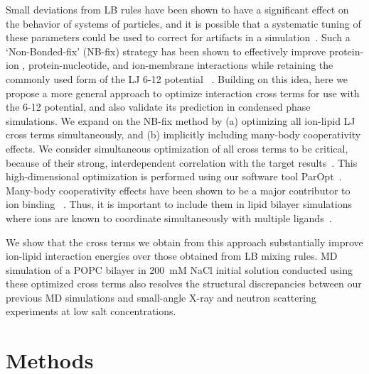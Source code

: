 \documentclass[12pt,openany,final]{book}
\begin{document}
Small deviations from LB rules have been shown to have a significant
    effect on the behavior of systems of particles\cite{boda:2008:effects}, and
    it is possible that a systematic tuning of these parameters could be used to correct 
    for artifacts in a simulation~\cite{baker:2010:accurate,yoo:2012:improved,fyta:2012:ionic,mamatkulov:2013:force,venable:2013,
savelyev:2014:balancing,li:2015:representation,savelyev:2015:competition,jing:2017:study,reif:2017,wineman:2019}.
Such a `Non-Bonded-fix' (NB-fix) strategy has been shown to effectively improve 
protein-ion 
, protein-nucleotide, and ion-membrane interactions 
while retaining the commonly used form of the LJ 6-12 potential~
\cite{baker:2010:accurate,yoo:2012:improved,fyta:2012:ionic,mamatkulov:2013:force,venable:2013,
savelyev:2014:balancing,li:2015:representation,savelyev:2015:competition,jing:2017:study,reif:2017,wineman:2019}. 
Building on this idea, here we propose a more 
general approach to optimize interaction cross terms
for use with the 6-12 potential, 
and also validate its prediction in condensed phase simulations.  
We expand on the NB-fix method by
(a) optimizing all ion-lipid LJ cross terms simultaneously, and 
(b) implicitly including many-body cooperativity effects.
We consider simultaneous optimization of all cross terms to be critical, 
because of their strong, interdependent correlation with the target results~\cite{fogarty:2014:paropt}.
This high-dimensional optimization is performed using our software tool
ParOpt~\cite{fogarty:2014:paropt,fogarty:2014:thesis}.
Many-body cooperativity effects have been shown to be a major contributor to ion 
binding~\cite{varma:2010}
. Thus, it is important to include them in lipid bilayer simulations where ions are known
to coordinate simultaneously with multiple ligands~\cite{kruczek:2019}.

We show that the cross terms we obtain from this approach substantially improve 
ion-lipid interaction energies over those obtained from LB mixing rules. 
MD simulation of a POPC bilayer
 in 200~mM NaCl initial solution 
conducted using these optimized cross terms also 
resolves the structural discrepancies between our 
previous MD simulations and small-angle X-ray and neutron scattering experiments 
at low salt concentrations.


\section{Methods}
\end{document}
